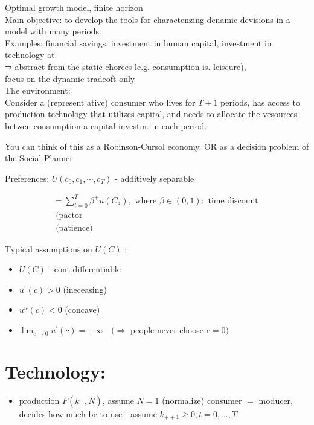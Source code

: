 \documentclass[10pt]{article}
\begin{document}
Optimal growth model, finite horizon\\
Main objective: to develop the tools for charactenzing denamic devisions in a model with many periods.\\
Examples: financial savings, investment in human capital, investment in technology at.\\
⇒ abstract from the static chorces le.g. consumption is. leiscure),\\
focus on the dynamic tradeoft only\\
The environment:\\
Consider a (represent ative) consumer who lives for $T+1$ periods, has access to production technology that utilizes capital, and needs to allocate the vesources betwen consumption a capital investm. in each period.

You can think of this as a Robinson-Cursol economy. OR as a decision problem of the Social Planner

Preferences: $U\left(c_{0}, c_{1}, \cdots, c_{T}\right)$ - additively separable

$$
\begin{array}{r}
=\sum_{t=0}^{T} \beta^{+} u\left(C_{4}\right), \text { where } \beta \in(0,1): \text { time discount } \\
\text { (pactor } \\
\text { (patience) }
\end{array}
$$

Typical assumptions on $U(C)$ :

\begin{itemize}
  \item $U(C)$ - cont differentiable
  \item $u^{\prime}(c)>0$ (ineceasing)
  \item $u^{n}(c)<0$ (concave)
  \item $\lim _{c \rightarrow 0} u^{\prime}(c)=+\infty \quad(\Rightarrow$ people never choose $c=0)$
\end{itemize}

\section*{Technology:}
\begin{itemize}
  \item production $F\left(k_{+}, N\right)$, assume $N=1$ (normalize) consumer $=$ moducer, decides how much be to use - assume $k_{++1} \geqslant 0, t=0, \ldots, T$
\end{itemize}
\end{document}
